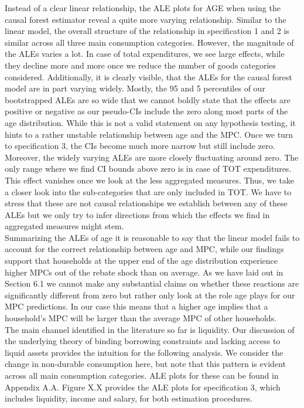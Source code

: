 Instead of a clear linear relationship, the ALE plots for AGE when using the causal forest estimator reveal a quite more varying relationship. Similar to the linear model, the overall structure of the relationship in specification 1 and 2 is similar across all three main consumption categories. However, the magnitude of the ALEs varies a lot. In case of total expenditures, we see large effects, while they decline more and more once we reduce the number of goods categories considered. Additionally, it is clearly visible, that the ALEs for the causal forest model are in part varying widely. Mostly, the 95 and 5 percentiles of our bootstrapped ALEs are so wide that we cannot boldly state that the effects are positive or negative as our pseudo-CIs include the zero along most parts of the age distribution. While this is not a valid statement on any hypothesis testing, it hints to a rather unstable relationship between age and the MPC. Once we turn to specification 3, the CIs become much more narrow but still include zero. Moreover, the widely varying ALEs are more closely fluctuating around zero. The only range where we find CI bounds above zero is in case of TOT expenditures. This effect vanishes once we look at the less aggregated measures. Thus, we take a closer look into the sub-categories that are only included in TOT. We have to stress that these are not causal relationships we establish between any of these ALEs but we only try to infer directions from which the effects we find in aggregated measures might stem. \\
Summarizing the ALEs of age it is reasonable to say that the linear model fails to account for the correct relationship between age and MPC, while our findings support that households at the upper end of the age distribution experience higher MPCs out of the rebate shock than on average. As we have laid out in Section 6.1 we cannot make any substantial claims on whether these reactions are significantly different from zero but rather only look at the role age plays for our MPC predictions. In our case this means that a higher age implies that a household's MPC will be larger than the average MPC of other households. \\
The main channel identified in the literature so far is liquidity. Our discussion of the underlying theory of binding borrowing constraints and lacking access to liquid assets provides the intuition for the following analysis. We consider the change in non-durable consumption here, but note that this pattern is evident across all main consumption categories. ALE plots for these can be found in Appendix A.A. Figure X.X provides the ALE plots for specification 3, which includes liquidity, income and salary, for both estimation procedures. \\
